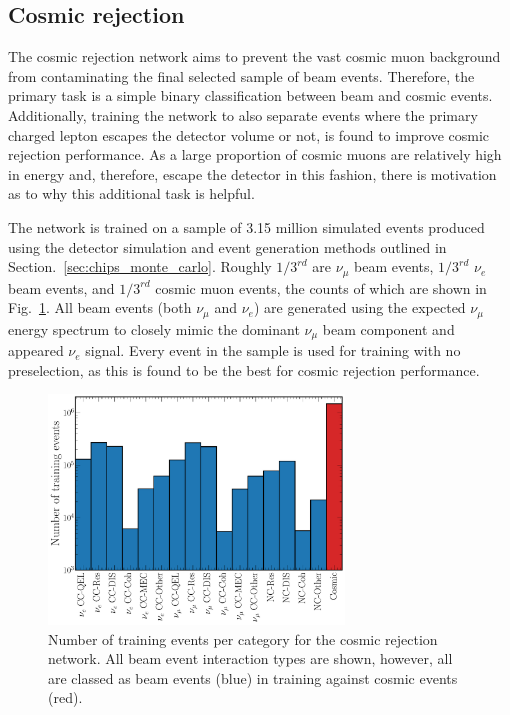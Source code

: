 \subsection{Cosmic rejection} %
\label{sec:cnn_specific_cosmic} %

The cosmic rejection network aims to prevent the vast cosmic muon background from contaminating
the final selected sample of beam events. Therefore, the primary task is a simple binary
classification between beam and cosmic events. Additionally, training the network to also separate
events where the primary charged lepton escapes the detector volume or not, is found to improve
cosmic rejection performance. As a large proportion of cosmic muons are relatively high in energy
and, therefore, escape the detector in this fashion, there is motivation as to why this additional
task is helpful.

The network is trained on a sample of 3.15 million simulated events produced using the detector
simulation and event generation methods outlined in Section.~\ref{sec:chips_monte_carlo}. Roughly
$1/3^{rd}$ are $\nu_{\mu}$ beam events, $1/3^{rd}$ $\nu_{e}$ beam events, and $1/3^{rd}$ cosmic
muon events, the counts of which are shown in Fig.~\ref{fig:cosmic_training_sample}. All beam
events (both $\nu_{\mu}$ and $\nu_{e}$) are generated using the expected \chipsfive $\nu_{\mu}$
energy spectrum to closely mimic the dominant $\nu_{\mu}$ beam component and appeared $\nu_{e}$
signal. Every event in the sample is used for training with no preselection, as this is found to
be the best for cosmic rejection performance.

\begin{figure} %
    \includegraphics[width=0.7\textwidth]{diagrams/7-results/explore_cosmic_training_sample.pdf}
    \caption[Number of training events per category for the cosmic rejection network]
    {Number of training events per category for the cosmic rejection network. All beam event
        interaction types are shown, however, all are classed as beam events (blue) in training
        against cosmic events (red).}
    \label{fig:cosmic_training_sample}
\end{figure}

